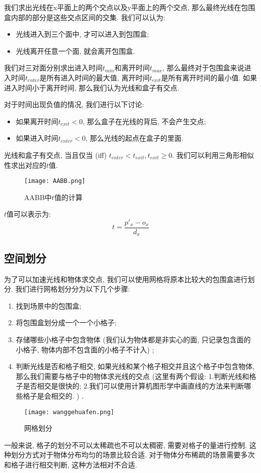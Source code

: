\documentclass[openany]{progbookcn}
\begin{document}
我们求出光线在x平面上的两个交点以及y平面上的两个交点, 那么最终光线在包围盒内部的部分是这些交点区间的交集. 我们可以认为: 
\begin{itemize}
	\item 光线进入到三个面中, 才可以进入到包围盒; 
	\item 光线离开任意一个面, 就会离开包围盒. 
\end{itemize}
我们对三对面分别求出进入时间$t_{min}$和离开时间$t_{max}$, 那么最终对于包围盒来说进入时间$t_{enter}$是所有进入时间的最大值, 离开时间$t_{exit}$是所有离开时间的最小值. 如果进入时间小于离开时间, 那么我们认为光线和盒子有交点. 

对于时间出现负值的情况, 我们进行以下讨论: 
\begin{itemize}
	\item 如果离开时间$t_{exit}<0$, 那么盒子在光线的背后, 不会产生交点; 
	\item 如果进入时间$t_{enter} < 0$, 那么光线的起点在盒子的里面. 
\end{itemize}

光线和盒子有交点, 当且仅当 (iff) $t_{enter}<t_{exit}, t_{exit}\geq 0$.
我们可以利用三角形相似性求出对应的$t$值. 
\begin{figure}[H]
	\centering
	\texttt{[image: AABB.png]}
	\caption{AABB中$t$值的计算}
	\label{fig:aabb}
\end{figure}
$t$值可以表示为: 
\begin{equation}
	t=\frac{p'_x-o_x}{d_x}
\end{equation}

\subsection{空间划分}
为了可以加速光线和物体求交点, 我们可以使用网格将原本比较大的包围盒进行划分. 我们进行网格划分分为以下几个步骤: 
\begin{enumerate}
	\item 找到场景中的包围盒; 
	\item 将包围盒划分成一个一个小格子; 
	\item 存储哪些小格子中包含物体 (我们认为物体都是非实心的面, 只记录包含面的小格子, 物体内部不包含面的小格子不计入) ; 
	\item 判断光线是否和格子相交, 如果光线和某个格子相交并且这个格子中包含物体, 那么我们需要与格子中的物体求光线的交点 (这里有两个假设: 1.判断光线和格子是否相交是很快的; 2.我们可以使用计算机图形学中画直线的方法来判断哪些格子是会相交的. ) . 
\end{enumerate}
\begin{figure}[H]
	\centering
	\texttt{[image: wanggehuafen.png]}
	\caption{网格划分}
	\label{fig:wghf}
\end{figure}
一般来说, 格子的划分不可以太稀疏也不可以太稠密, 需要对格子的量进行控制. 这种划分方式对于物体分布均匀的场景比较合适. 对于物体分布稀疏的场景需要多次和格子进行相交判断, 这种方法相对不合适. 
\end{document}
